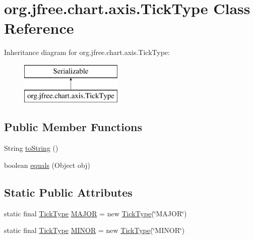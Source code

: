 \hypertarget{classorg_1_1jfree_1_1chart_1_1axis_1_1_tick_type}{}\section{org.\+jfree.\+chart.\+axis.\+Tick\+Type Class Reference}
\label{classorg_1_1jfree_1_1chart_1_1axis_1_1_tick_type}
Inheritance diagram for org.\+jfree.\+chart.\+axis.\+Tick\+Type\+:\begin{figure}[H]
\begin{center}
\leavevmode
\includegraphics[height=2.000000cm]{classorg_1_1jfree_1_1chart_1_1axis_1_1_tick_type}
\end{center}
\end{figure}
\subsection*{Public Member Functions}
\begin{DoxyCompactItemize}
\item 
String \mbox{\hyperlink{classorg_1_1jfree_1_1chart_1_1axis_1_1_tick_type_a47552fee32af5fa91ea4f1ba5c52e2ca}{to\+String}} ()
\item 
boolean \mbox{\hyperlink{classorg_1_1jfree_1_1chart_1_1axis_1_1_tick_type_ae4e1dab53387e17715af8ba66de97fdc}{equals}} (Object obj)
\end{DoxyCompactItemize}
\subsection*{Static Public Attributes}
\begin{DoxyCompactItemize}
\item 
static final \mbox{\hyperlink{classorg_1_1jfree_1_1chart_1_1axis_1_1_tick_type}{Tick\+Type}} \mbox{\hyperlink{classorg_1_1jfree_1_1chart_1_1axis_1_1_tick_type_a415a9fea96014a917943ee8d0e321986}{M\+A\+J\+OR}} = new \mbox{\hyperlink{classorg_1_1jfree_1_1chart_1_1axis_1_1_tick_type}{Tick\+Type}}(\char`\"{}M\+A\+J\+OR\char`\"{})
\item 
static final \mbox{\hyperlink{classorg_1_1jfree_1_1chart_1_1axis_1_1_tick_type}{Tick\+Type}} \mbox{\hyperlink{classorg_1_1jfree_1_1chart_1_1axis_1_1_tick_type_acd4c166051e42164c9ab936fbd7b80e9}{M\+I\+N\+OR}} = new \mbox{\hyperlink{classorg_1_1jfree_1_1chart_1_1axis_1_1_tick_type}{Tick\+Type}}(\char`\"{}M\+I\+N\+OR\char`\"{})
\end{DoxyCompactItemize}


